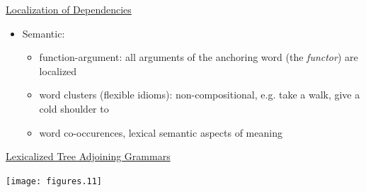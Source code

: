 \documentclass[landscape]{slides}
\begin{document}
\begin{slide}{\underline{Localization of Dependencies}}
\begin{itemize}
\item Semantic: 
\begin{itemize}
\item function-argument: all arguments of the anchoring word (the {\em
  functor}) are localized
\item word clusters (flexible idioms): non-compositional,
  e.g. {\color{blue} take a walk, give a cold shoulder to}
\item word co-occurences, lexical semantic aspects of meaning
\end{itemize}
\end{itemize}
\end{slide}

\begin{slide}{\underline{Lexicalized Tree Adjoining Grammars}}
\begin{center}
\texttt{[image: figures.11]}
\end{center}
\end{slide}
\end{document}
